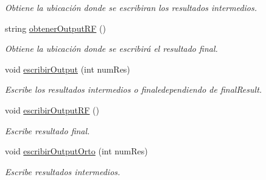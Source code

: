 \begin{DoxyCompactItemize}
\begin{DoxyCompactList}\small\item\em Obtiene la ubicación donde se escribiran los resultados intermedios. \end{DoxyCompactList}\item 
string \mbox{\hyperlink{classuav_1_1Stitcher_a5f6f8f09c80f39daf9f2ea34e0db91b9}{obtener\+Output\+RF}} ()
\begin{DoxyCompactList}\small\item\em Obtiene la ubicación donde se escribirá el resultado final. \end{DoxyCompactList}\item 
void \mbox{\hyperlink{classuav_1_1Stitcher_a079c00542221b0e2fc551d2e97df7b97}{escribir\+Output}} (int num\+Res)
\begin{DoxyCompactList}\small\item\em Escribe los resultados intermedios o finaledependiendo de final\+Result. \end{DoxyCompactList}\item 
\mbox{\label{classuav_1_1Stitcher_aedccb071e6ee13405e842c0764a08ecd}} 
void \mbox{\hyperlink{classuav_1_1Stitcher_aedccb071e6ee13405e842c0764a08ecd}{escribir\+Output\+RF}} ()
\begin{DoxyCompactList}\small\item\em Escribe resultado final. \end{DoxyCompactList}\item 
void \mbox{\hyperlink{classuav_1_1Stitcher_aa3ed2d63f08d787b3b78ec4445195b2b}{escribir\+Output\+Orto}} (int num\+Res)
\begin{DoxyCompactList}\small\item\em Escribe resultados intermedios. \end{DoxyCompactList}\end{DoxyCompactItemize}
